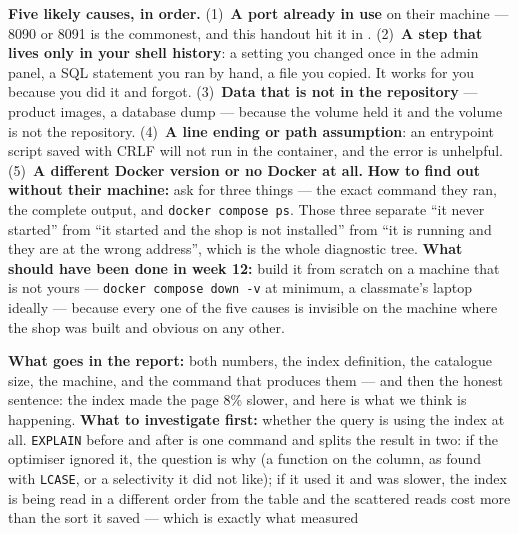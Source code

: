 \begin{ans}
  \item \textbf{Five likely causes, in order.} (1)~\textbf{A port already in
        use} on their machine --- 8090 or 8091 is the commonest, and this
        handout hit it in . (2)~\textbf{A step that lives only in
        your shell history}: a setting you changed once in the admin panel, a
        SQL statement you ran by hand, a file you copied. It works for you
        because you did it and forgot. (3)~\textbf{Data that is not in the
        repository} --- product images, a database dump --- because the volume
        held it and the volume is not the repository. (4)~\textbf{A line ending
        or path assumption}: an entrypoint script saved with CRLF will not run
        in the container, and the error is unhelpful. (5)~\textbf{A different
        Docker version or no Docker at all.} \textbf{How to find out without
        their machine:} ask for three things --- the exact command they ran,
        the complete output, and \texttt{docker compose ps}. Those three
        separate ``it never started'' from ``it started and the shop is not
        installed'' from ``it is running and they are at the wrong address'',
        which is the whole diagnostic tree. \textbf{What should have been done
        in week 12:} build it from scratch on a machine that is not yours ---
        \texttt{docker compose down -v} at minimum, a classmate's laptop
        ideally --- because every one of the five causes is invisible on the
        machine where the shop was built and obvious on any other.
  \item \textbf{What goes in the report:} both numbers, the index definition,
        the catalogue size, the machine, and the command that produces them ---
        and then the honest sentence: the index made the page 8\% slower, and
        here is what we think is happening. \textbf{What to investigate
        first:} whether the query is using the index at all. \texttt{EXPLAIN}
        before and after is one command and splits the result in two: if the
        optimiser ignored it, the question is why (a function on the column, as
         found with \texttt{LCASE}, or a selectivity it did
        not like); if it used it and was slower, the index is being read in a
        different order from the table and the scattered reads cost more than
        the sort it saved --- which is exactly what  measured

\end{ans}
